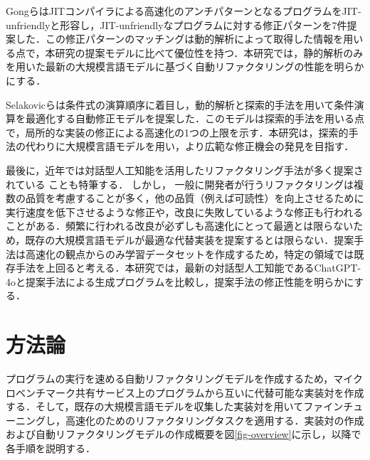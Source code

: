 \documentclass[submit,techrep,noauthor]{ipsj}
\newcommand{\todo}[1]{\colorbox{yellow}{{\bf TODO}:}{\color{red} {\textbf{[#1]}}}}
\begin{document}
Gongら\cite{Gong_2015}はJITコンパイラによる高速化のアンチパターンとなるプログラムをJIT-unfriendlyと形容し，JIT-unfriendlyなプログラムに対する修正パターンを7件提案した．この修正パターンのマッチングは動的解析によって取得した情報を用いる点で，本研究の提案モデルに比べて優位性を持つ．本研究では，静的解析のみを用いた最新の大規模言語モデルに基づく自動リファクタリングの性能を明らかにする．

Selakovicら\cite{Selakovic_2017}は条件式の演算順序に着目し，動的解析と探索的手法を用いて条件演算を最適化する自動修正モデルを提案した．このモデルは探索的手法を用いる点で，局所的な実装の修正による高速化の1つの上限を示す．本研究は，探索的手法の代わりに大規模言語モデルを用い，より広範な修正機会の発見を目指す．

最後に，近年では対話型人工知能を活用したリファクタリング手法が多く提案されている
\cite{Ishizue_2024}\cite{Shirafuji_2023}ことも特筆する．%
しかし，%
一般に開発者が行うリファクタリングは複数の品質を考慮することが多く，他の品質（例えば可読性）を向上させるために実行速度を低下させるような修正や，改良に失敗しているような修正も行われることがある．頻繁に行われる改良が必ずしも高速化にとって最適とは限らないため，既存の大規模言語モデルが最適な代替実装を提案するとは限らない．提案手法は高速化の観点からのみ学習データセットを作成するため，特定の領域では既存手法を上回ると考える．本研究では，最新の対話型人工知能であるChatGPT-4oと提案手法による生成プログラムを比較し，提案手法の修正性能を明らかにする．


\section{方法論}\label{sec:method}

プログラムの実行を速める自動リファクタリングモデルを作成するため，マイクロベンチマーク共有サービス上のプログラムから互いに代替可能な実装対を作成する．そして，既存の大規模言語モデルを収集した実装対を用いてファインチューニングし，高速化のためのリファクタリングタスクを適用する．実装対の作成および自動リファクタリングモデルの作成概要を図\ref{fig-overview}に示し，以降で各手順を説明する．
\end{document}
